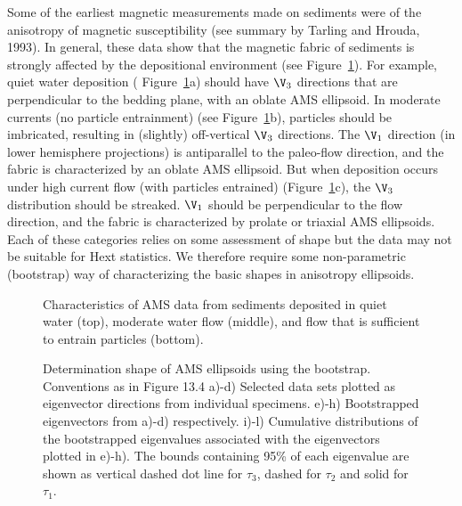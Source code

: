 Some of the earliest magnetic measurements made on sediments were of the
anisotropy of magnetic susceptibility (see summary by 
Tarling and Hrouda, 1993). \nocite{tarling93} In general, these data   show that
 the  magnetic fabric of sediments is strongly
affected by the depositional environment  (see Figure~\ref{fig:sedams}). 
For example, quiet water deposition ( Figure~\ref{fig:sedams}a) should have $\V_3$ directions that are  perpendicular to the bedding plane, with  an oblate AMS ellipsoid.
 In moderate currents (no particle entrainment) (see Figure~\ref{fig:sedams}b),  particles should be imbricated, resulting in (slightly) off-vertical $\V_3$
directions.    The $\V_1$ direction (in lower hemisphere projections)
is antiparallel to the paleo-flow direction,  and the fabric is characterized by an oblate AMS ellipsoid.  But when deposition occurs under high current flow (with particles entrained) (Figure~\ref{fig:sedams}c), the $\V_3$ distribution should be streaked.     $\V_1$ should be perpendicular to  the flow direction, and
the fabric is characterized by prolate or triaxial AMS ellipsoids.     Each of these categories relies on some assessment of shape but the data may not be suitable for Hext statistics.   We therefore require some non-parametric (bootstrap) way of characterizing the basic shapes in anisotropy ellipsoids.  



\begin{figure}[htb]
\epsfxsize 12cm
\centering {}
\caption{Characteristics of AMS data from sediments deposited in
quiet water (top), moderate water flow (middle), and flow that is
sufficient to entrain particles (bottom). 
 }
\label{fig:sedams}
\end{figure}

 
 


\begin{figure}[h!tp]
\epsfxsize 16cm
\centering {} 
 \caption{Determination shape of AMS ellipsoids using the bootstrap. Conventions as in Figure 13.4
a)-d)  Selected data sets plotted as eigenvector directions from individual specimens.  
e)-h) Bootstrapped eigenvectors from a)-d) respectively.   i)-l) Cumulative distributions  of the bootstrapped eigenvalues 
associated with the eigenvectors plotted in e)-h).   The bounds containing 95\% of each eigenvalue are shown as vertical dashed dot line for $\tau_3$, dashed for $\tau_2$ and solid for $\tau_1$.   }
\label{fig:shape}
\end{figure}

